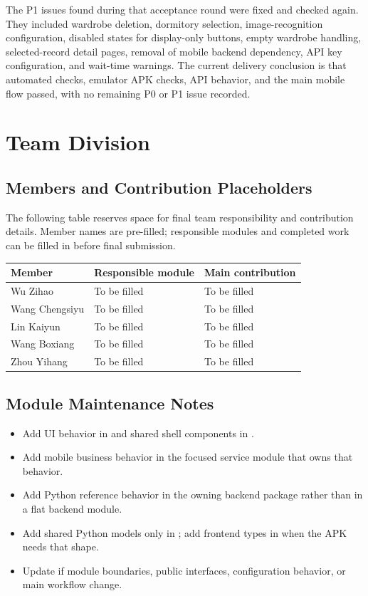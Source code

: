 \documentclass[11pt,a4paper]{article}
\begin{document}
The P1 issues found during that acceptance round were fixed and checked again. They included wardrobe deletion, dormitory selection, image-recognition configuration, disabled states for display-only buttons, empty wardrobe handling, selected-record detail pages, removal of mobile backend dependency, API key configuration, and wait-time warnings. The current delivery conclusion is that automated checks, emulator APK checks, API behavior, and the main mobile flow passed, with no remaining P0 or P1 issue recorded.

\section{Team Division}

\subsection{Members and Contribution Placeholders}

The following table reserves space for final team responsibility and contribution details. Member names are pre-filled; responsible modules and completed work can be filled in before final submission.

\begin{longtable}{p{} p{} p{}}
\toprule
Member & Responsible module & Main contribution \\
\midrule
Wu Zihao & To be filled & To be filled \\
Wang Chengsiyu & To be filled & To be filled \\
Lin Kaiyun & To be filled & To be filled \\
Wang Boxiang & To be filled & To be filled \\
Zhou Yihang & To be filled & To be filled \\
\bottomrule
\end{longtable}

\subsection{Module Maintenance Notes}

\begin{itemize}
  \item Add UI behavior in  and shared shell components in .
  \item Add mobile business behavior in the focused  service module that owns that behavior.
  \item Add Python reference behavior in the owning backend package rather than in a flat backend module.
  \item Add shared Python models only in ; add frontend types in  when the APK needs that shape.
  \item Update  if module boundaries, public interfaces, configuration behavior, or main workflow change.
\end{itemize}
\end{document}
